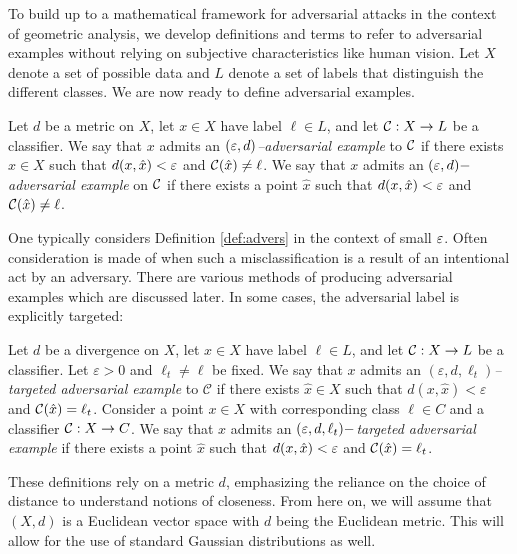 To build up to a mathematical framework for adversarial attacks in the
context of geometric analysis, we develop definitions and terms to
refer to adversarial examples without relying on subjective
characteristics like human vision. Let $X$ denote a set of possible
data and $L$ denote a set of labels that distinguish the different
classes. We are now ready to define adversarial examples.

\begin{definition} \label{def:advers}
Let $d$ be a metric on $X$, let $x\in X$ have label $\ell\in L$, and let $\mathcal{C}:X\to L$ be a classifier.  We say that $x$ admits an \emph{$(\varepsilon,d)$--adversarial example} to $\mathcal{C}$ if there exists $\hat x \in X$ such that $d(x,\hat x) < \varepsilon$ and $\mathcal{C}(\hat x) \neq \ell$.
We say that $x$ admits an \emph{$(\varepsilon,d)-$adversarial example} on $\mathcal{C}$ if there exists a point $\hat x$ such that $d(x,\hat x) < \varepsilon$ and $\mathcal{C}(\hat x) \neq \ell$. 
\end{definition}

One typically considers Definition \ref{def:advers} in the context of small $\varepsilon$. 
Often consideration is made of when such a misclassification is a result of an intentional act by an adversary. 
There are various methods of producing adversarial examples which are discussed later. In some cases, the adversarial label is explicitly targeted:
\begin{definition}
Let $d$ be a divergence on $X$, let $x\in X$ have label $\ell\in L$, and let $\mathcal{C}:X\to L$ be a classifier.  Let $\varepsilon>0$ and $\ell_t\neq \ell$ be fixed. We say that $x$ admits an \emph{$(\varepsilon,d,\ell_t)$--targeted adversarial example} to $\mathcal{C}$ if there exists $\hat{x}\in X$ such that $d(x,\hat{x})<\varepsilon$ and $\mathcal{C}(\hat{x})=\ell_t$.
Consider a point $x \in X$ with corresponding class $\ell \in C$ and a classifier $\mathcal{C}: X \to C$. We say that $x$ admits an \emph{$(\varepsilon,d,\ell_t)-$targeted adversarial example}  if there exists a point $\hat x$ such that $d(x,\hat x) < \varepsilon$ and $\mathcal{C}(\hat x) = \ell_t$. 
\end{definition}

These definitions rely on a metric $d$, emphasizing the reliance on the choice of distance to understand notions of closeness. From here on, we will assume that $(X,d)$ is a Euclidean vector space with $d$ being the Euclidean metric. This will allow for the use of standard Gaussian distributions as well.%


